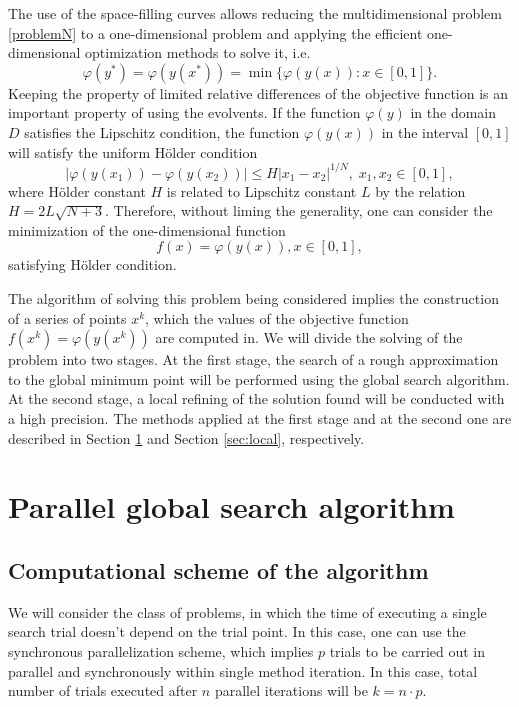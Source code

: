 \documentclass[runningheads]{llncs}
\begin{document}
The use of the space-filling curves allows reducing the multidimensional problem \ref{problemN} to a one-dimensional problem and applying the efficient one-dimensional optimization methods to solve it, i.e. 
\begin{equation} \label{problem_ref}
\varphi(y^*) = \varphi(y(x^*)) = \min{\{ \varphi(y(x)): x \in [0, 1] \}}.
\end{equation}
Keeping the property of limited relative differences of the objective function is an important property of using the evolvents. If the function $\varphi(y)$ in the domain $D$ satisfies the Lipschitz condition, the function $\varphi(y(x))$ in the interval $[0,1]$ will satisfy the uniform H{\"o}lder condition
\begin{equation} \label{holder_ref}
\left| \varphi(y(x_1)) - \varphi(y(x_2)) \right| \leq H {\left| x_1 - x_2 \right|}^{1/N}, \; x_1, x_2 \in [0,1],
\end{equation}
where H{\"o}lder constant $H$ is related to Lipschitz constant $L$ by the relation $H = 2L\sqrt{N+3}$. Therefore, without liming the generality, one can consider the minimization of the one-dimensional function 
\begin{equation} \label{minim_fun_ref}
f(x) = \varphi(y(x)), x \in [0,1],
\end{equation}
satisfying H{\"o}lder condition.

The algorithm of solving this problem being considered implies the construction of a series of points $x^k$, which the values of the objective function  $f(x^k) = \varphi(y(x^k))$ are computed in. We will divide the solving of the problem into two stages. At the first stage, the search of a rough approximation to the global minimum point will be performed using the global search algorithm. At the second stage, a local refining of the solution found will be conducted with a high precision. The methods applied at the first stage and at the second one are described in Section \ref{sec:global} and Section \ref{sec:local}, respectively.

\section{Parallel global search algorithm}\label{sec:global}
\subsection{Computational scheme of the algorithm}

We will consider the class of problems, in which the time of executing a single search trial doesn’t depend on the trial point. In this case, one can use the synchronous parallelization scheme, which implies $p$ trials to be carried out in parallel and synchronously within single method iteration. In this case, total number of trials executed after $n$ parallel iterations will be $k=n \cdot p$.
\end{document}
